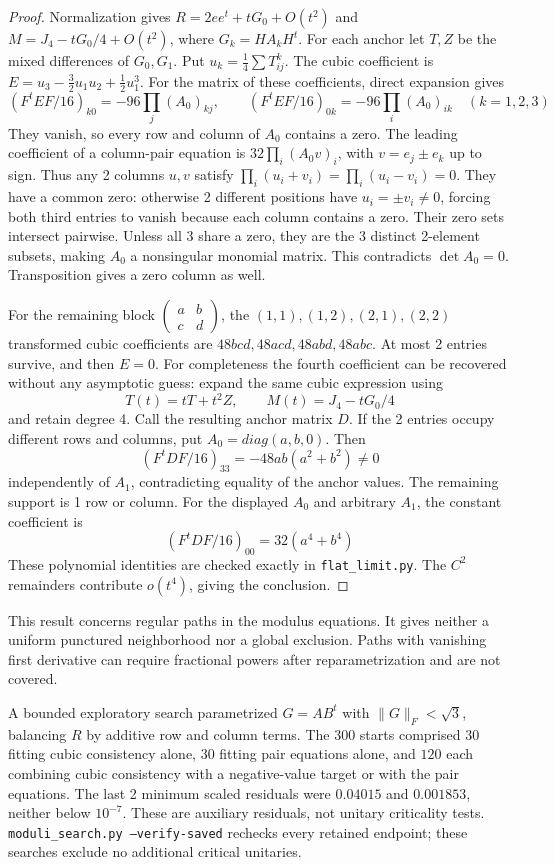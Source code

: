 \documentclass[11pt,a4paper]{article}
\begin{document}
\begin{proof}
Normalization gives $R=2ee^t+tG_0+O(t^2)$ and
$M=J_4-tG_0/4+O(t^2)$, where $G_k=HA_kH^t$.
For each anchor let $T,Z$ be the mixed differences of $G_0,G_1$.
Put $u_k=\frac14\sum T_{ij}^k$. The cubic coefficient is
$E=u_3-\frac32u_1u_2+\frac12u_1^3$.
For the matrix of these coefficients, direct expansion gives
\[
 (F^tEF/16)_{k0}=-96\prod_j(A_0)_{kj},\qquad
 (F^tEF/16)_{0k}=-96\prod_i(A_0)_{ik}\quad(k=1,2,3)
\]
They vanish, so every row and column of $A_0$ contains a zero.
The leading coefficient of a column-pair equation is
$32\prod_i(A_0v)_i$, with $v=e_j\pm e_k$ up to sign.
Thus any 2 columns $u,v$ satisfy
$\prod_i(u_i+v_i)=\prod_i(u_i-v_i)=0$.
They have a common zero: otherwise 2 different positions have
$u_i=\pm v_i\ne0$, forcing both third entries to vanish because each
column contains a zero. Their zero sets intersect pairwise. Unless
all 3 share a zero, they are the 3 distinct 2-element
subsets, making $A_0$ a nonsingular monomial matrix. This contradicts
$\det A_0=0$. Transposition gives a zero column as well.

For the remaining block $\left(\begin{smallmatrix}a&b\\c&d\end{smallmatrix}\right)$,
the $(1,1),(1,2),(2,1),(2,2)$ transformed cubic coefficients are
$48bcd,48acd,48abd,48abc$. At most 2 entries survive, and then $E=0$.
For completeness the fourth coefficient can be recovered without any
asymptotic guess: expand the same cubic expression using
\[
 T(t)=tT+t^2Z,\qquad M(t)=J_4-tG_0/4
\]
and retain degree 4. Call the resulting anchor matrix $D$.
If the 2 entries occupy different rows and columns, put
$A_0=diag(a,b,0)$. Then
\[
 (F^tDF/16)_{33}=-48ab(a^2+b^2)\ne0
\]
independently of $A_1$, contradicting equality of the anchor values.
The remaining support is 1 row or column. For the displayed $A_0$
and arbitrary $A_1$, the constant coefficient is
\[
 (F^tDF/16)_{00}=32(a^4+b^4)
\]
These polynomial identities are checked exactly in \texttt{flat\_limit.py}.
The $C^2$ remainders contribute $o(t^4)$, giving the conclusion.
\end{proof}
This result concerns regular paths in the modulus equations. It gives
neither a uniform punctured neighborhood nor a global exclusion.
Paths with vanishing first derivative can require fractional powers
after reparametrization and are not covered.

A bounded exploratory search parametrized $G=AB^t$ with
$\|G\|_F<\sqrt3$, balancing $R$ by additive row and column terms.
The $300$ starts comprised $30$ fitting cubic consistency alone, $30$
fitting pair equations alone, and $120$ each combining cubic consistency
with a negative-value target or with the pair equations. The last 2
minimum scaled residuals were $0.04015$ and $0.001853$, neither below
$10^{-7}$. These are auxiliary residuals, not unitary criticality tests.
\texttt{moduli\_search.py --verify-saved} rechecks every retained endpoint;
these searches exclude no additional critical unitaries.
\end{document}
